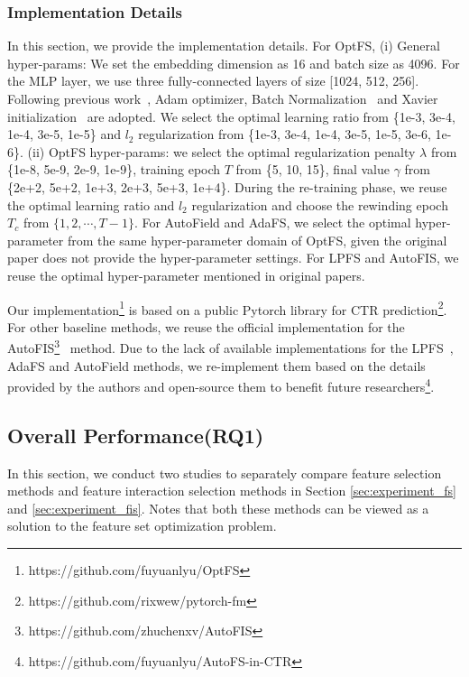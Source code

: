 \documentclass[sigconf]{acmart}
\begin{document}
\subsubsection{Implementation Details}
In this section, we provide the implementation details. For OptFS, (i) General hyper-params: We set the embedding dimension as 16 and batch size as 4096. For the MLP layer, we use three fully-connected layers of size [1024, 512, 256]. Following previous work~\cite{IPNN}, Adam optimizer, Batch Normalization~\cite{BatchNorm} and Xavier initialization~\cite{Xavier} are adopted. We select the optimal learning ratio from \{1e-3, 3e-4, 1e-4, 3e-5, 1e-5\} and $l_2$ regularization from \{1e-3, 3e-4, 1e-4, 3e-5, 1e-5, 3e-6, 1e-6\}. (ii) OptFS hyper-params: we select the optimal regularization penalty $\lambda$ from \{1e-8, 5e-9, 2e-9, 1e-9\}, training epoch $T$ from \{5, 10, 15\}, final value $\gamma$ from \{2e+2, 5e+2, 1e+3, 2e+3, 5e+3, 1e+4\}. During the re-training phase, we reuse the optimal learning ratio and $l_2$ regularization and choose the rewinding epoch $T_c$ from $\{1, 2, \cdots, T-1\}$.
For AutoField and AdaFS, we select the optimal hyper-parameter from the same hyper-parameter domain of OptFS, given the original paper does not provide the hyper-parameter settings. For LPFS and AutoFIS, we reuse the optimal hyper-parameter mentioned in original papers.

Our implementation\footnote{https://github.com/fuyuanlyu/OptFS} is based on a public Pytorch library for CTR prediction\footnote{https://github.com/rixwew/pytorch-fm}. For other baseline methods, we reuse the official implementation for the AutoFIS\footnote{https://github.com/zhuchenxv/AutoFIS}~\cite{AutoFIS} method. Due to the lack of available implementations for the LPFS~\cite{LPFS}, AdaFS\cite{AdaFS} and AutoField\cite{AutoField} methods, we re-implement them based on the details provided by the authors and open-source them to benefit future researchers\footnote{https://github.com/fuyuanlyu/AutoFS-in-CTR}.

\subsection{Overall Performance(RQ1)}

In this section, we conduct two studies to separately compare feature selection methods and feature interaction selection methods in Section \ref{sec:experiment_fs} and \ref{sec:experiment_fis}. Notes that both these methods can be viewed as a solution to the feature set optimization problem.
\end{document}
